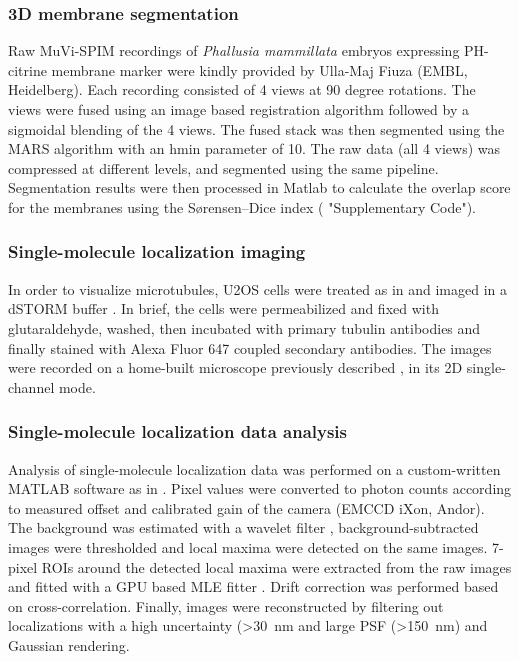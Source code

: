 \subsubsection{3D membrane segmentation}
Raw MuVi-SPIM recordings of \textit{Phallusia mammillata} embryos expressing PH-citrine membrane marker were kindly provided by Ulla-Maj Fiuza (EMBL, Heidelberg). Each recording consisted of 4 views at 90 degree rotations. The views were fused using an image based registration algorithm followed by a sigmoidal blending of the 4 views. The fused stack was then segmented using the MARS algorithm \cite{fernandez_imaging_2010} with an hmin parameter of 10. The raw data (all 4 views) was compressed at different levels, and segmented using the same pipeline. Segmentation results were then processed in Matlab to calculate the overlap score for the membranes using the Sørensen–Dice index ( "Supplementary Code").

\subsubsection{Single-molecule localization imaging}
In order to visualize microtubules, U2OS cells were treated as in \cite{deschamps_3d_2014} and imaged in a dSTORM buffer \cite{heilemann_subdiffraction-resolution_2008}. In brief, the cells were permeabilized and fixed with glutaraldehyde, washed, then incubated with primary tubulin antibodies and finally stained with Alexa Fluor 647 coupled secondary antibodies. The images were recorded on a home-built microscope previously described \cite{deschamps_3d_2014}, in its 2D single-channel mode.

\subsubsection{Single-molecule localization data analysis}
Analysis of single-molecule localization data was performed on a custom-written MATLAB software as in \cite{deschamps_efficient_2016}. Pixel values were converted to photon counts according to measured offset and calibrated gain of the camera (EMCCD iXon, Andor). The background was estimated with a wavelet filter \cite{izeddin_wavelet_2012}, background-subtracted images were thresholded and local maxima were detected on the same images. 7-pixel ROIs around the detected local maxima were extracted from the raw images and fitted with a GPU based MLE fitter \cite{smith_fast_2010}. Drift correction was performed based on cross-correlation. Finally, images were
reconstructed by filtering out localizations with a high uncertainty (>\SI{30}{nm} and large PSF (>\SI{150}{nm}) and Gaussian rendering.

